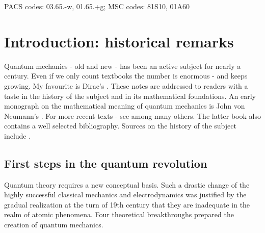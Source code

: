 \documentclass[12pt]{article}
\begin{document}
\bigskip

PACS codes: 03.65.-w, 01.65.+g; MSC codes: 81S10, 01A60

\newpage

\tableofcontents
\bigskip

 
\newpage


\section{Introduction: historical remarks}
\setcounter{equation}{0}
\renewcommand\theequation{\thesection.\arabic{equation}}

\smallskip
Quantum mechanics - old and new - has been an active subject for nearly a century. Even if we only count  textbooks the number is enormous - and keeps growing. My favourite is Dirac's \cite{D30}. These notes are addressed to readers with a taste in the history of the subject and in its mathematical foundations. An early monograph on the mathematical meaning of quantum mechanics is John von Neumann's \cite{vN}. For more recent texts - see \cite{FY, Mac, T} among many others. The latter book also contains a well selected bibliography. Sources on the history of the subject include \cite{MR, Dar, Sch, PJ07}.

\subsection{First steps in the quantum revolution}

Quantum theory requires a new conceptual basis. Such a drastic change of the
highly successful classical mechanics and electrodynamics was justified by the
gradual realization at the turn of 19th century that they are inadequate in the
realm of atomic phenomena. Four theoretical breakthroughs prepared the creation
of quantum mechanics.
\end{document}
